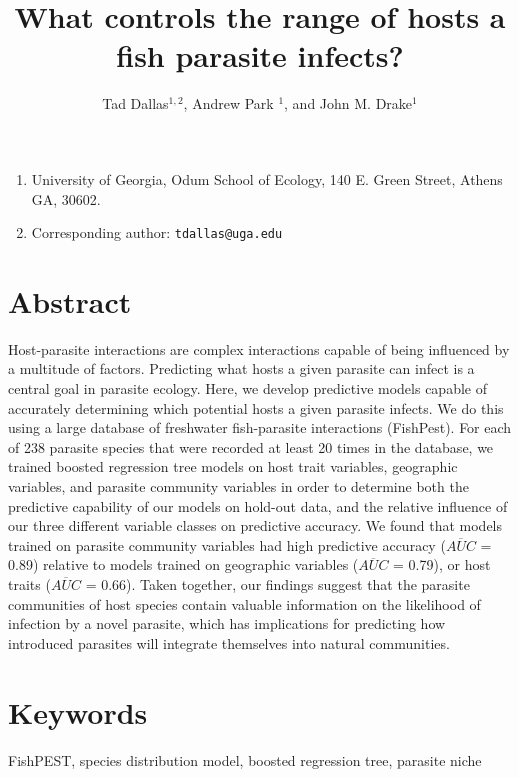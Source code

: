 \documentclass[12pt]{article}
\title{ What controls the range of hosts a fish parasite infects?}
\author{Tad Dallas$^{1,2}$, Andrew Park $^{1}$, and John M. Drake$^{1}$}
\date{}
\begin{document}
\setcounter{page}{1}
\maketitle{}
\vspace{-0.5cm}

\begin{enumerate}
  \item University of Georgia, Odum School of Ecology, 140 E. Green Street, Athens GA, 30602. 
  \item Corresponding author: \texttt{tdallas@uga.edu}
\end{enumerate}

\linenumbers
\doublespacing

\section*{Abstract}

Host-parasite interactions are complex interactions capable of being influenced by a multitude of factors. Predicting what hosts a given parasite can infect is a central goal in parasite ecology. Here, we develop predictive models capable of accurately determining which potential hosts a given parasite infects. We do this using a large database of freshwater fish-parasite interactions (FishPest). For each of 238 parasite species that were recorded at least 20 times in the database, we trained boosted regression tree models on host trait variables, geographic variables, and parasite community variables in order to determine both the predictive capability of our models on hold-out data, and the relative influence of our three different variable classes on predictive accuracy. We found that models trained on parasite community variables had high predictive accuracy ($\overline{AUC}$ = 0.89) relative to models trained on geographic variables ($\overline{AUC}$ = 0.79), or host traits ($\overline{AUC}$ = 0.66). Taken together, our findings suggest that the parasite communities of host species contain valuable information on the likelihood of infection by a novel parasite, which has implications for predicting how introduced parasites will integrate themselves into natural communities. 



\section*{Keywords}
FishPEST, species distribution model, boosted regression tree, parasite niche 
\end{document}
